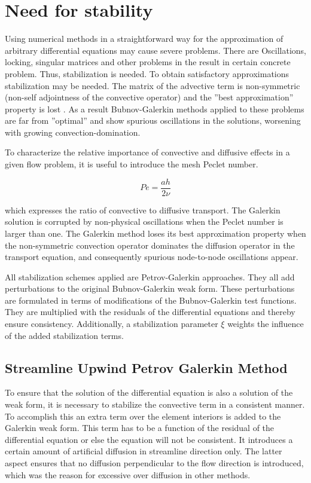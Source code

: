 \documentclass[10pt]{ubthesis}
\begin{document}
\section{Need for stability}
Using numerical methods in a straightforward way for the approximation of arbitrary differential
equations may cause severe problems. There are Oscillations, locking, singular matrices and other problems in the result in certain concrete problem.
Thus, stabilization is needed. To obtain satisfactory approximations stabilization may be needed. The matrix of the advective term is non-symmetric (non-self adjointness of the convective operator) and the ”best approximation” property is lost . As a result Bubnov-Galerkin methods applied to these problems are far from ”optimal” and show spurious oscillations in the solutions, worsening with growing convection-domination. 

\noindent To characterize the relative importance of convective and diffusive effects in a given flow
problem, it is useful to introduce the mesh Peclet number.

$$Pe=\frac{ah}{2\nu}$$

\noindent which expresses the ratio of convective to diffusive transport.
The  Galerkin solution is corrupted by non-physical oscillations when the Peclet number is larger than one. The Galerkin method loses its best approximation property when the non-symmetric convection operator dominates the diffusion operator in the transport equation, and consequently spurious node-to-node oscillations appear.

\noindent All stabilization schemes applied are Petrov-Galerkin approaches. They all add perturbations to the original Bubnov-Galerkin weak form. These perturbations are formulated in terms of modifications of the Bubnov-Galerkin test functions. They are multiplied with the residuals of the differential equations and thereby ensure consistency. Additionally, a stabilization parameter $\xi$ weights the influence of the added stabilization terms.

\subsection{Streamline Upwind Petrov Galerkin Method}
To ensure that the solution of the differential equation is also a solution of the
weak form, it is necessary to stabilize the convective term in a consistent manner. To accomplish this an extra term over the element interiors is added
to the Galerkin weak form. This term has to be a function of the residual of the differential equation or else the equation will not be consistent. It introduces a certain amount of artificial diffusion in streamline direction only. The latter aspect ensures that no diffusion perpendicular to the flow direction is introduced, which was the reason for excessive over diffusion in other methods. 
\end{document}
